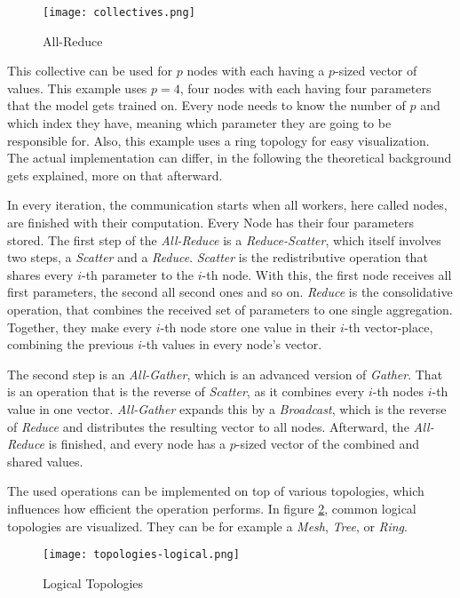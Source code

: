 \begin{figure}[H]  %
  \centering
  \texttt{[image: collectives.png]}
  \caption{All-Reduce}
  \label{fig:collectives}
\end{figure}

This collective can be used for $p$ nodes with each having a  $p$-sized vector of values. 
This example uses $p = 4$, four nodes with each having four parameters that the model gets trained on. 
Every node needs to know the number of $p$ and which index they have, meaning which parameter they are going to be responsible for. Also, this example uses a ring topology for easy visualization. The actual implementation can differ, in the following the theoretical background gets explained, more on that afterward.

In every iteration, the communication starts when all workers, here called nodes, are finished with their computation. Every Node has their four parameters stored.
The first step of the \textit{All-Reduce} is a \textit{Reduce-Scatter}, which itself involves two steps, a \textit{Scatter} and a \textit{Reduce}. \textit{Scatter} is the redistributive operation that shares every $i$-th parameter to the $i$-th node. With this, the first node receives all first parameters, the second all second ones and so on. 
\textit{Reduce} is the consolidative operation, that combines the received set of parameters to one single aggregation.
Together, they make every $i$-th node store one value in their $i$-th vector-place, combining the previous $i$-th values in every node's vector.

The second step is an \textit{All-Gather}, which is an advanced version of \textit{Gather}. That is an operation that is the reverse of \textit{Scatter}, as it combines every $i$-th nodes $i$-th value in one vector. \textit{All-Gather} expands this by a \textit{Broadcast}, which is the reverse of \textit{Reduce} and distributes the resulting vector to all nodes.
Afterward, the \textit{All-Reduce} is finished, and every node has a $p$-sized vector of the combined and shared values.

The used operations can be implemented  on top of various topologies, which influences how efficient the operation performs. In figure \ref{fig:topologies-logical}, common logical topologies are visualized. They can be for example a \textit{Mesh}, \textit{Tree}, or \textit{Ring}.

\begin{figure}[H]  %
  \centering
  \texttt{[image: topologies-logical.png]}
  \caption{Logical Topologies}
  \label{fig:topologies-logical}
\end{figure}

